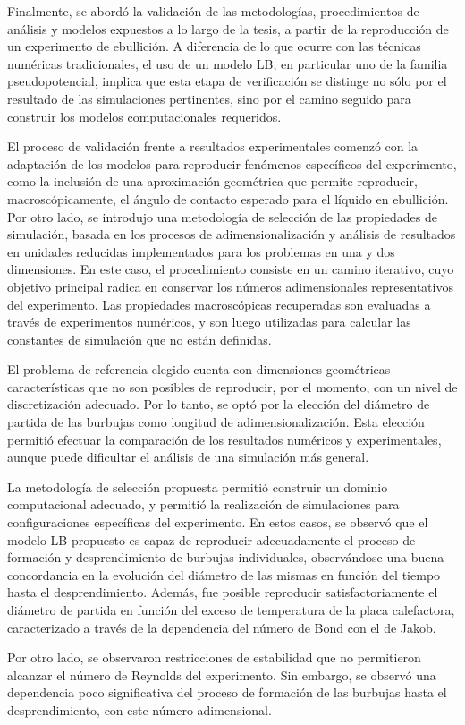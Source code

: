 \bigskip

Finalmente, se abord\'o la validaci\'on de las metodolog\'ias, procedimientos de an\'alisis y modelos expuestos a lo largo de la tesis, a partir de la reproducci\'on de un experimento de ebullici\'on. A diferencia de lo que ocurre con las t\'ecnicas num\'ericas tradicionales, el uso de un modelo LB, en particular uno de la familia pseudopotencial, implica que esta etapa de verificaci\'on se distinge no s\'olo por el resultado de las simulaciones pertinentes, sino por el camino seguido para construir los modelos computacionales requeridos.

El proceso de validaci\'on frente a resultados experimentales comenz\'o con la adaptaci\'on de los modelos para reproducir fen\'omenos espec\'ificos del experimento, como la inclusi\'on de una aproximaci\'on geom\'etrica que permite reproducir, macrosc\'opicamente, el \'angulo de contacto esperado para el l\'iquido en ebullici\'on.  Por otro lado, se introdujo una metodolog\'ia de selecci\'on de las propiedades de simulaci\'on, basada en los procesos de adimensionalizaci\'on y an\'alisis de resultados en unidades reducidas implementados para los problemas en una y dos dimensiones. En este caso, el procedimiento consiste en un camino iterativo, cuyo objetivo principal radica en conservar los n\'umeros adimensionales representativos del experimento. Las propiedades macrosc\'opicas recuperadas son evaluadas a trav\'es de experimentos num\'ericos, y son luego utilizadas para calcular las constantes de simulaci\'on que no est\'an definidas.

El problema de referencia elegido cuenta con dimensiones geom\'etricas caracter\'isticas que no son posibles de reproducir, por el momento, con un nivel de discretizaci\'on adecuado. Por lo tanto, se opt\'o por la elecci\'on del di\'ametro de partida de las burbujas como longitud de adimensionalizaci\'on. Esta elecci\'on permiti\'o efectuar la comparaci\'on de los resultados num\'ericos y experimentales, aunque puede dificultar el an\'alisis de una simulaci\'on m\'as general.

La metodolog\'ia de selecci\'on propuesta permiti\'o construir un dominio computacional adecuado, y permiti\'o la realizaci\'on de simulaciones para configuraciones espec\'ificas del experimento. En estos casos, se observ\'o que el modelo LB propuesto es capaz de reproducir adecuadamente el proceso de formaci\'on y desprendimiento de burbujas individuales, observ\'andose una buena concordancia en la evoluci\'on del di\'ametro de las mismas en funci\'on del tiempo hasta el desprendimiento. Adem\'as, fue posible reproducir satisfactoriamente el di\'ametro de partida en funci\'on del exceso de temperatura de la placa calefactora, caracterizado a trav\'es de la dependencia del n\'umero de Bond con el de Jakob. 

Por otro lado, se observaron restricciones de estabilidad que no permitieron alcanzar el n\'umero de Reynolds del experimento. Sin embargo, se observ\'o una dependencia poco significativa del proceso de formaci\'on de las burbujas hasta el desprendimiento, con este n\'umero adimensional.